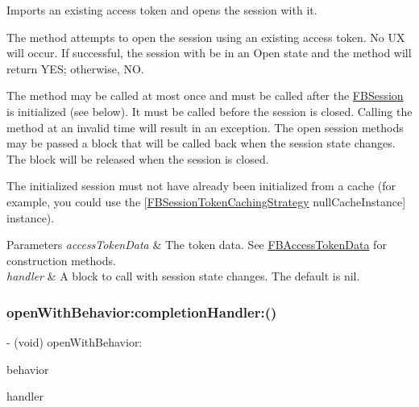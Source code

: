 Imports an existing access token and opens the session with it.

The method attempts to open the session using an existing access token. No UX will occur. If successful, the session with be in an Open state and the method will return Y\+ES; otherwise, NO.

The method may be called at most once and must be called after the {\ttfamily \hyperlink{interfaceFBSession}{F\+B\+Session}} is initialized (see below). It must be called before the session is closed. Calling the method at an invalid time will result in an exception. The open session methods may be passed a block that will be called back when the session state changes. The block will be released when the session is closed.

The initialized session must not have already been initialized from a cache (for example, you could use the {\ttfamily \mbox{[}\hyperlink{interfaceFBSessionTokenCachingStrategy}{F\+B\+Session\+Token\+Caching\+Strategy} null\+Cache\+Instance\mbox{]}} instance).


\begin{DoxyParams}{Parameters}
{\em access\+Token\+Data} & The token data. See {\ttfamily \hyperlink{interfaceFBAccessTokenData}{F\+B\+Access\+Token\+Data}} for construction methods. \\
\hline
{\em handler} & A block to call with session state changes. The default is nil. \\
\hline
\end{DoxyParams}
\mbox{\label{interfaceFBSession_add7058f99fde92c093a92acf192dcd0a}} 
\subsubsection{\texorpdfstring{open\+With\+Behavior\+:completion\+Handler\+:()}{openWithBehavior:completionHandler:()}\hspace{0.1cm}{\footnotesize\ttfamily [1/5]}}
{\footnotesize\ttfamily -\/ (void) open\+With\+Behavior\+: \begin{DoxyParamCaption}\item[{(F\+B\+Session\+Login\+Behavior)}]{behavior }\item[{completionHandler:(F\+B\+Session\+State\+Handler)}]{handler }\end{DoxyParamCaption}}

